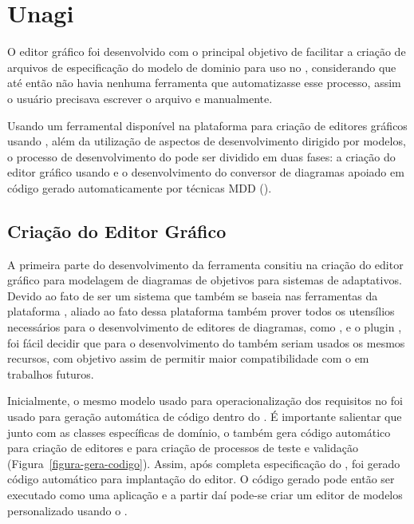 \chapter{Unagi}
\label{sec-unagi}

O editor gráfico \unagi foi desenvolvido com o principal objetivo de facilitar a criação de arquivos de especificação do modelo de dominio para uso no \zanshin, considerando que até então não havia nenhuma ferramenta que automatizasse esse processo, assim o usuário precisava escrever o arquivo \xml e \ecore manualmente. 

Usando um ferramental disponível na plataforma \eclipse para criação de editores gráficos usando \emf, além da utilização de aspectos de desenvolvimento dirigido por modelos, o processo de desenvolvimento do \unagi pode ser dividido em duas fases: a criação do editor gráfico usando \sirius e o desenvolvimento do conversor de diagramas apoiado em código gerado automaticamente por técnicas MDD (\mdd).


\section{Criação do Editor Gráfico}
\label{sec-unagi-criacao-editor}

A primeira parte do desenvolvimento da ferramenta consitiu  na criação do editor gráfico para modelagem de diagramas de objetivos para sistemas de adaptativos. Devido ao fato de \zanshin ser um sistema que também se baseia nas ferramentas da plataforma \eclipse, aliado ao fato dessa plataforma também prover todos os utensílios necessários para o desenvolvimento de editores de diagramas, como \ecore, \emf e o plugin \sirius, foi fácil decidir que para o desenvolvimento do \unagi também seriam usados os mesmos recursos, com objetivo assim de permitir maior compatibilidade com o \zanshin em trabalhos futuros.

Inicialmente, o mesmo modelo \ecore usado para operacionalização dos requisitos no \zanshin foi usado para geração automática de código dentro do \eclipse \emf. É importante salientar que junto com as classes específicas de domínio, o \emf também gera código automático para criação de editores e para criação de processos de teste e validação (Figura~\ref{figura-gera-codigo}). Assim, após completa especificação do \ecore, foi gerado código automático para implantação do editor. O código gerado pode então ser executado como uma aplicação \eclipse e a partir daí pode-se criar um editor de modelos personalizado usando o \sirius.

